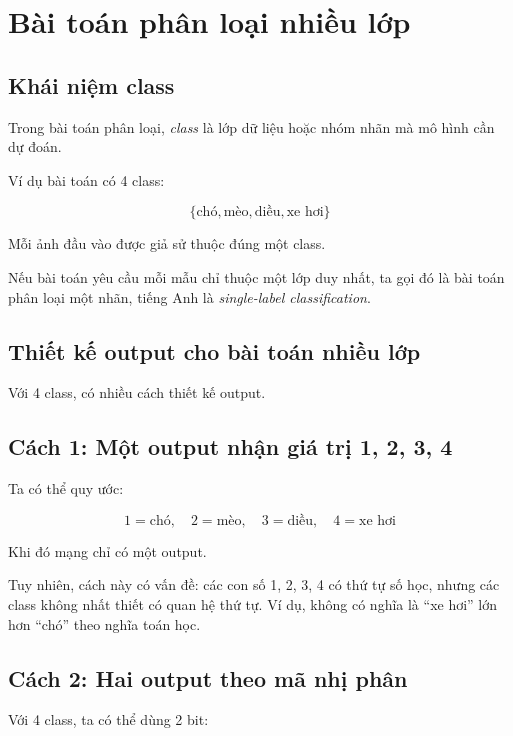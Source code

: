 \section{Bài toán phân loại nhiều lớp}

\subsection{Khái niệm class}

Trong bài toán phân loại, \textit{class} là lớp dữ liệu hoặc nhóm nhãn mà mô hình cần dự đoán.

Ví dụ bài toán có 4 class:

\[
    \{\text{chó}, \text{mèo}, \text{diều}, \text{xe hơi}\}
\]

Mỗi ảnh đầu vào được giả sử thuộc đúng một class.

\begin{ghinho}
Nếu bài toán yêu cầu mỗi mẫu chỉ thuộc một lớp duy nhất, ta gọi đó là bài toán phân loại một nhãn, tiếng Anh là \textit{single-label classification}.
\end{ghinho}

\subsection{Thiết kế output cho bài toán nhiều lớp}

Với 4 class, có nhiều cách thiết kế output.

\subsection{Cách 1: Một output nhận giá trị 1, 2, 3, 4}

Ta có thể quy ước:

\[
    1 = \text{chó}, \quad
    2 = \text{mèo}, \quad
    3 = \text{diều}, \quad
    4 = \text{xe hơi}
\]

Khi đó mạng chỉ có một output.

Tuy nhiên, cách này có vấn đề: các con số 1, 2, 3, 4 có thứ tự số học, nhưng các class không nhất thiết có quan hệ thứ tự. Ví dụ, không có nghĩa là ``xe hơi'' lớn hơn ``chó'' theo nghĩa toán học.

\subsection{Cách 2: Hai output theo mã nhị phân}

Với 4 class, ta có thể dùng 2 bit:

